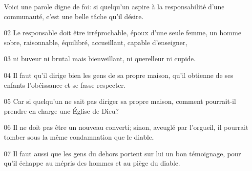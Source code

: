 Voici une parole digne de foi: si quelqu’un aspire à la responsabilité d’une communauté, c’est une belle tâche qu’il désire.

02 Le responsable doit être irréprochable, époux d’une seule femme, un homme sobre, raisonnable, équilibré, accueillant, capable d’enseigner,

03 ni buveur ni brutal mais bienveillant, ni querelleur ni cupide.

04 Il faut qu’il dirige bien les gens de sa propre maison, qu’il obtienne de ses enfants l’obéissance et se fasse respecter.

05 Car si quelqu’un ne sait pas diriger sa propre maison, comment pourrait-il prendre en charge une Église de Dieu?

06 Il ne doit pas être un nouveau converti; sinon, aveuglé par l’orgueil, il pourrait tomber sous la même condamnation que le diable.

07 Il faut aussi que les gens du dehors portent sur lui un bon témoignage, pour qu’il échappe au mépris des hommes et au piège du diable.
